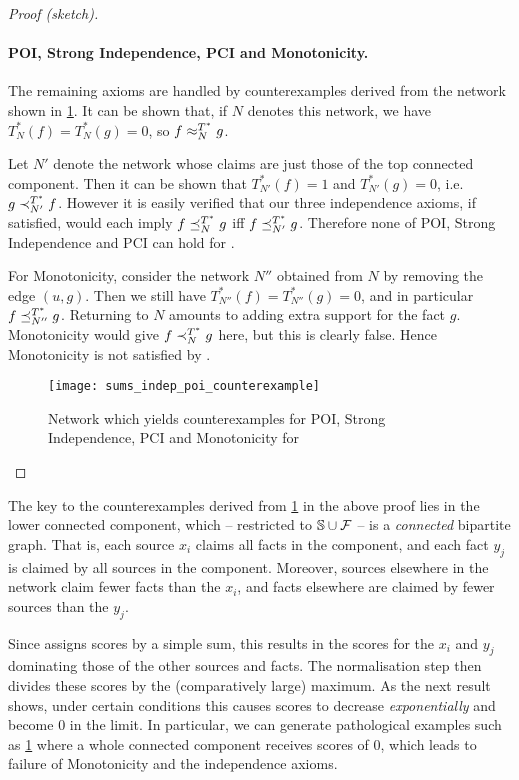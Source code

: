 \begin{proof}[Proof (sketch)]
\paragraph{POI, Strong Independence, PCI and Monotonicity.}

The remaining axioms are handled by counterexamples derived from the network
shown in \cref{td_fig_sums_indep_poi_counterexample}. It can be shown that, if $N$
denotes this network, we have $T_N^*(f) = T_N^*(g) = 0$, so $f \approx_N^{T^*} g$.

Let $N'$ denote the network whose claims are just those of the top connected
component. Then it can be shown that $T_{N'}^*(f) = 1$ and $T_{N'}^*(g) = 0$,
i.e.  $g \prec_{N'}^{T^*} f$.  However it is easily verified that our three
independence axioms, if satisfied, would each imply $f \preceq_N^{T^*} g$ iff $f
\preceq_{N'}^{T^*} g$. Therefore none of POI, Strong Independence and PCI can
hold for \sums{}.

For Monotonicity, consider the network $N''$ obtained from $N$ by removing the
edge $(u, g)$. Then we still have $T_{N''}^*(f) = T_{N''}^*(g) = 0$, and in
particular $f \preceq_{N''}^{T^*} g$. Returning to $N$ amounts to adding extra
support for the fact $g$. Monotonicity would give $f \prec_N^{T^*} g$ here, but
this is clearly false. Hence Monotonicity is not satisfied by \sums{}.

\begin{figure}[ht]
\centering
\texttt{[image: sums\_indep\_poi\_counterexample]}
\caption{
    Network which yields counterexamples for POI, Strong Independence,
    PCI and Monotonicity for \sums{}
}
\label{td_fig_sums_indep_poi_counterexample}
\end{figure}
\end{proof}

The key to the counterexamples derived from
\cref{td_fig_sums_indep_poi_counterexample} in the above proof lies in the lower
connected component, which -- restricted to $\mathbb{S} \cup \mathcal{F}$ -- is a
\emph{connected} bipartite graph. That is, each source $x_i$ claims all facts
in the component, and each fact $y_j$ is claimed by all sources in the
component.  Moreover, sources elsewhere in the network claim fewer facts than
the $x_i$, and facts elsewhere are claimed by fewer sources than the $y_j$.

Since \sums{} assigns scores by a simple sum, this results in the scores for
the $x_i$ and $y_j$ dominating those of the other sources and facts. The
normalisation step then divides these scores by the (comparatively large)
maximum. As the next result shows, under certain conditions this causes scores
to decrease \emph{exponentially} and become 0 in the limit. In particular, we
can generate pathological examples such as
\cref{td_fig_sums_indep_poi_counterexample} where a whole connected component
receives scores of 0, which leads to failure of Monotonicity and the
independence axioms.

